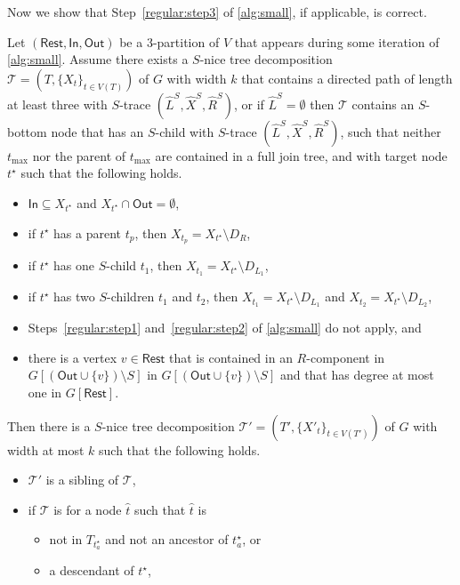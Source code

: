 \documentclass[a4paper,UKenglish,cleveref, autoref, thm-restate, numberwithinsect]{lipics-v2021}
\newcommand{\slim}{\text{slim}\xspace}
\newcommand{\topheavy}{\text{top-heavy}\xspace}
\newcommand{\In}{\mathsf{In}}
\newcommand{\Out}{\mathsf{Out}}
\newcommand{\Rest}{\mathsf{Rest}}
\begin{document}
Now we show that Step~\ref{regular:step3} of \cref{alg:small}, if applicable, is correct.

\begin{lemma}\label{lem:regularstep3}
Let $(\Rest,\In,\Out)$ be a 3-partition of $V$ that appears during some iteration of \cref{alg:small}. 
Assume there exists a \slim $S$-nice tree decomposition $\mathcal{T}=(T,\{X_t\}_{t\in V(T)})$ of $G$ with width $k$ that contains a directed path of length at least three with $S$-trace $(\hat{L}^S, \hat{X}^S, \hat{R}^S)$, or if $\hat{L}^S=\emptyset$ then $\mathcal{T}$ contains an $S$-bottom node that has an $S$-child with $S$-trace $(\hat{L}^S, \hat{X}^S, \hat{R}^S)$, such that neither $t_{\max}$ nor the parent of $t_{\max}$ are contained in a full join tree, and with target node ${t^\star}$ such that the following holds.
\begin{itemize}
\item $\In\subseteq X_{t^\star}$ and $X_{t^\star}\cap \Out=\emptyset$, 
        \item if $t^\star$ has a parent $t_p$, then $X_{t_p}=X_{t^\star}\setminus D_R$, 
    \item if $t^\star$ has one $S$-child $t_1$, then $X_{t_1}=X_{t^\star}\setminus D_{L_1}$, 
    \item if $t^\star$ has two $S$-children $t_1$ and $t_2$, then $X_{t_1}=X_{t^\star}\setminus D_{L_1}$ and $X_{t_2}=X_{t^\star}\setminus D_{L_2}$,
    \item Steps~\ref{regular:step1} and~\ref{regular:step2} of \cref{alg:small} do not apply, and
    \item there is a vertex $v\in\Rest$ that is contained in an $R$-component in $G[(\Out\cup\{v\})\setminus S]$ in $G[(\Out\cup\{v\})\setminus S]$ and that has degree at most one in $G[\Rest]$.
\end{itemize} 
Then there is a \slim $S$-nice tree decomposition $\mathcal{T}'=(T',\{X'_t\}_{t\in V(T')})$ of $G$ with width at most $k$ 
such that the following holds.
\begin{itemize}
\item $\mathcal{T}'$ is a sibling of $\mathcal{T}$,
\item if $\mathcal{T}$ is \topheavy for a node $\hat{t}$ such that $\hat{t}$ is
\begin{itemize}
    \item not in $T_{t^\star_a}$ and not an ancestor of $t^\star_a$, or
    \item a descendant of $t^\star$,
\end{itemize}

\end{itemize}
\end{lemma}
\end{document}
